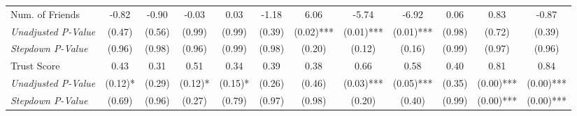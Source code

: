 \begin{tabular}{l c c c c c c c c c c c}
Num. of Friends & -0.82 & -0.90 & -0.03 & 0.03 & -1.18 & 6.06 & -5.74 & -6.92 & 0.06 & 0.83 & -0.87 \\
\quad \textit{Unadjusted P-Value} & (0.47) & (0.56) & (0.99) & (0.99) & (0.39) & (0.02)*** & (0.01)*** & (0.01)*** & (0.98) & (0.72) & (0.39) \\
\quad \textit{Stepdown P-Value} & (0.96) & (0.98) & (0.96) & (0.99) & (0.98) & (0.20) & (0.12) & (0.16) & (0.99) & (0.97) & (0.96) \\
Trust Score & 0.43 & 0.31 & 0.51 & 0.34 & 0.39 & 0.38 & 0.66 & 0.58 & 0.40 & 0.81 & 0.84 \\
\quad \textit{Unadjusted P-Value} & (0.12)* & (0.29) & (0.12)* & (0.15)* & (0.26) & (0.46) & (0.03)*** & (0.05)*** & (0.35) & (0.00)*** & (0.00)*** \\
\quad \textit{Stepdown P-Value} & (0.69) & (0.96) & (0.27) & (0.79) & (0.97) & (0.98) & (0.20) & (0.40) & (0.99) & (0.00)*** & (0.00)*** \\
\bottomrule
\end{tabular}
